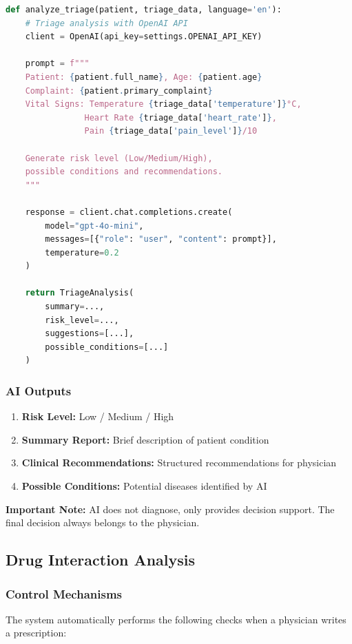 \documentclass[12pt,a4paper]{article}
\begin{document}
\begin{lstlisting}[language=Python, caption=AI Triage Analysis]
def analyze_triage(patient, triage_data, language='en'):
    # Triage analysis with OpenAI API
    client = OpenAI(api_key=settings.OPENAI_API_KEY)
    
    prompt = f"""
    Patient: {patient.full_name}, Age: {patient.age}
    Complaint: {patient.primary_complaint}
    Vital Signs: Temperature {triage_data['temperature']}°C, 
                Heart Rate {triage_data['heart_rate']}, 
                Pain {triage_data['pain_level']}/10
    
    Generate risk level (Low/Medium/High), 
    possible conditions and recommendations.
    """
    
    response = client.chat.completions.create(
        model="gpt-4o-mini",
        messages=[{"role": "user", "content": prompt}],
        temperature=0.2
    )
    
    return TriageAnalysis(
        summary=...,
        risk_level=...,
        suggestions=[...],
        possible_conditions=[...]
    )
\end{lstlisting}

\subsubsection{AI Outputs}
\begin{enumerate}
    \item \textbf{Risk Level:} Low / Medium / High
    \item \textbf{Summary Report:} Brief description of patient condition
    \item \textbf{Clinical Recommendations:} Structured recommendations for physician
    \item \textbf{Possible Conditions:} Potential diseases identified by AI
\end{enumerate}

\textbf{Important Note:} AI does not diagnose, only provides decision support. The final decision always belongs to the physician.

\subsection{Drug Interaction Analysis}

\subsubsection{Control Mechanisms}
The system automatically performs the following checks when a physician writes a prescription:
\end{document}
